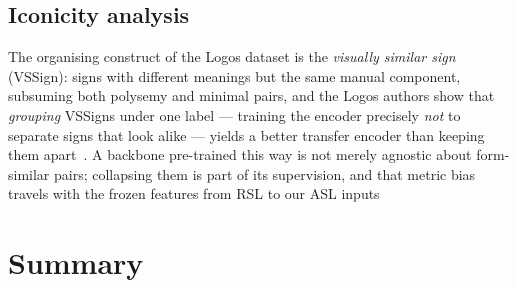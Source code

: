 \subsection{Iconicity analysis}
The organising
construct of the Logos dataset is the \emph{visually similar sign}
(VSSign): signs with different meanings but the same manual component,
subsuming both polysemy and minimal pairs, and the Logos authors show
that \emph{grouping} VSSigns under one label --- training the encoder
precisely \emph{not} to separate signs that look alike --- yields a
better transfer encoder than keeping them
apart~\cite{ovodovLogosWellTemperedPretrain2025}. A backbone
pre-trained this way is not merely agnostic about form-similar pairs;
collapsing them is part of its supervision, and that metric bias
travels with the frozen features from RSL to our ASL inputs





\section{Summary}
